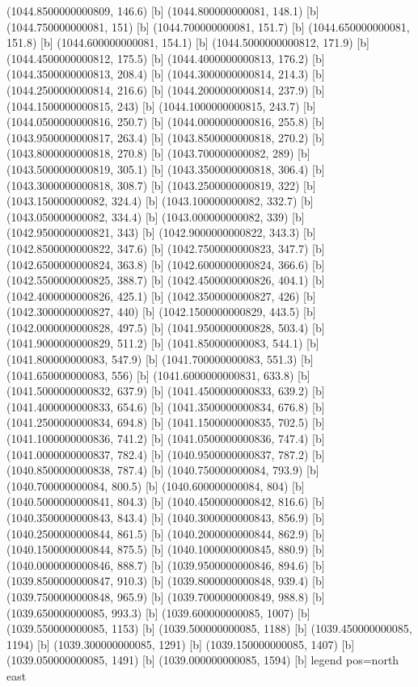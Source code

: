 {{{(1044.8500000000809, 146.6) [b] 
(1044.800000000081, 148.1) [b] 
(1044.750000000081, 151) [b] 
(1044.700000000081, 151.7) [b] 
(1044.650000000081, 151.8) [b] 
(1044.600000000081, 154.1) [b] 
(1044.5000000000812, 171.9) [b] 
(1044.4500000000812, 175.5) [b] 
(1044.4000000000813, 176.2) [b] 
(1044.3500000000813, 208.4) [b] 
(1044.3000000000814, 214.3) [b] 
(1044.2500000000814, 216.6) [b] 
(1044.2000000000814, 237.9) [b] 
(1044.1500000000815, 243) [b] 
(1044.1000000000815, 243.7) [b] 
(1044.0500000000816, 250.7) [b] 
(1044.0000000000816, 255.8) [b] 
(1043.9500000000817, 263.4) [b] 
(1043.8500000000818, 270.2) [b] 
(1043.8000000000818, 270.8) [b] 
(1043.700000000082, 289) [b] 
(1043.5000000000819, 305.1) [b] 
(1043.3500000000818, 306.4) [b] 
(1043.3000000000818, 308.7) [b] 
(1043.2500000000819, 322) [b] 
(1043.150000000082, 324.4) [b] 
(1043.100000000082, 332.7) [b] 
(1043.050000000082, 334.4) [b] 
(1043.000000000082, 339) [b] 
(1042.9500000000821, 343) [b] 
(1042.9000000000822, 343.3) [b] 
(1042.8500000000822, 347.6) [b] 
(1042.7500000000823, 347.7) [b] 
(1042.6500000000824, 363.8) [b] 
(1042.6000000000824, 366.6) [b] 
(1042.5500000000825, 388.7) [b] 
(1042.4500000000826, 404.1) [b] 
(1042.4000000000826, 425.1) [b] 
(1042.3500000000827, 426) [b] 
(1042.3000000000827, 440) [b] 
(1042.1500000000829, 443.5) [b] 
(1042.0000000000828, 497.5) [b] 
(1041.9500000000828, 503.4) [b] 
(1041.9000000000829, 511.2) [b] 
(1041.850000000083, 544.1) [b] 
(1041.800000000083, 547.9) [b] 
(1041.700000000083, 551.3) [b] 
(1041.650000000083, 556) [b] 
(1041.6000000000831, 633.8) [b] 
(1041.5000000000832, 637.9) [b] 
(1041.4500000000833, 639.2) [b] 
(1041.4000000000833, 654.6) [b] 
(1041.3500000000834, 676.8) [b] 
(1041.2500000000834, 694.8) [b] 
(1041.1500000000835, 702.5) [b] 
(1041.1000000000836, 741.2) [b] 
(1041.0500000000836, 747.4) [b] 
(1041.0000000000837, 782.4) [b] 
(1040.9500000000837, 787.2) [b] 
(1040.8500000000838, 787.4) [b] 
(1040.750000000084, 793.9) [b] 
(1040.700000000084, 800.5) [b] 
(1040.600000000084, 804) [b] 
(1040.5000000000841, 804.3) [b] 
(1040.4500000000842, 816.6) [b] 
(1040.3500000000843, 843.4) [b] 
(1040.3000000000843, 856.9) [b] 
(1040.2500000000844, 861.5) [b] 
(1040.2000000000844, 862.9) [b] 
(1040.1500000000844, 875.5) [b] 
(1040.1000000000845, 880.9) [b] 
(1040.0000000000846, 888.7) [b] 
(1039.9500000000846, 894.6) [b] 
(1039.8500000000847, 910.3) [b] 
(1039.8000000000848, 939.4) [b] 
(1039.7500000000848, 965.9) [b] 
(1039.7000000000849, 988.8) [b] 
(1039.650000000085, 993.3) [b] 
(1039.600000000085, 1007) [b] 
(1039.550000000085, 1153) [b] 
(1039.500000000085, 1188) [b] 
(1039.450000000085, 1194) [b] 
(1039.300000000085, 1291) [b] 
(1039.150000000085, 1407) [b] 
(1039.050000000085, 1491) [b] 
(1039.000000000085, 1594) [b] 
}}}{legend pos=north east}